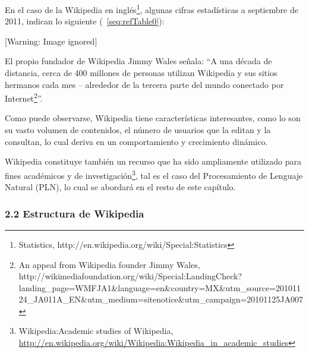 \documentclass[letterpaper]{article}
\makeatletter
\newcommand\captionof[1]{\def\@captype{#1}\caption}
\makeatother
\begin{document}
\bigskip

{\sffamily
En el caso de la Wikipedia en ingl\'es\footnote{Statistics,
http://en.wikipedia.org/wiki/Special:Statistics}, algunas cifras
estad\'isticas a septiembre de 2011, indican lo siguiente
(\tablename~\ref{seq:refTable0}):}



\begin{center}
\begin{minipage}{13.878cm}
\captionof{table}[Datos estad\'isticos de la Wikipedia en
Ingl\'es.]{Datos estad\'isticos de la Wikipedia en Ingl\'es.}
\label{seq:refTable0} [Warning: Image ignored]
\end{minipage}
\end{center}
{\sffamily
El propio fundador de Wikipedia Jimmy Wales se\~nala:
{\textquotedblleft}A una d\'ecada de distancia, cerca de 400 millones
de personas utilizan Wikipedia y sus sitios hermanos cada mes --
alrededor de la tercera parte del mundo conectado por
Internet\footnote{An appeal from Wikipedia founder Jimmy Wales,
http://wikimediafoundation.org/wiki/Special:LandingCheck?landing\_page=WMFJA1\&language=en\&country=MX\&utm\_source=20101124\_JA011A\_EN\&utm\_medium=sitenotice\&utm\_campaign=20101125JA007}{\textquotedblright}.}

{\sffamily
Como puede observarse, Wikipedia tiene caracter\'isticas interesantes,
como lo son su vasto volumen de contenidos, el n\'umero de usuarios que
la editan y la consultan, lo cual deriva en un comportamiento y
crecimiento din\'amico.}


\bigskip

{\sffamily
Wikipedia constituye tambi\'en un recurso que ha sido ampliamente
utilizado para fines acad\'emicos y de
investigaci\'on\footnote{\foreignlanguage{spanish}{\textrm{Wikipedia:Academic
studies of Wikipedia,
}}\url{http://en.wikipedia.org/wiki/Wikipedia:Wikipedia_in_academic_studies}},
tal es el caso del Procesamiento de Lenguaje Natural (PLN), lo cual se
abordar\'a en el resto de este cap\'itulo.}


\bigskip

\subsubsection{2.2 Estructura de Wikipedia}

\bigskip
\end{document}
